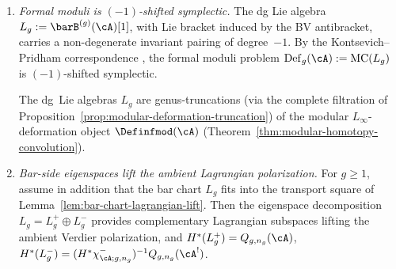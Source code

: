 \begin{theorem}
\begin{enumerate}[label=\textup{(\roman*)}]
\item \emph{Formal moduli is $(-1)$-shifted symplectic.}
 The dg Lie algebra $L_g := \barB^{(g)}(\cA)[1]$, with Lie bracket
 induced by the BV antibracket, carries a non-degenerate invariant
 pairing of degree~$-1$. By the Kontsevich--Pridham correspondence
 \cite{Pridham17}, the formal moduli problem
 $\mathrm{Def}_g(\cA) := \mathrm{MC}(L_g)$
 is $(-1)$-shifted symplectic.

 The dg~Lie algebras $L_g$ are genus-truncations (via the complete
 filtration of
 Proposition~\ref{prop:modular-deformation-truncation}) of the
 modular $L_\infty$-deformation object $\Definfmod(\cA)$
 (Theorem~\ref{thm:modular-homotopy-convolution}).
\item \emph{Bar-side eigenspaces lift the ambient Lagrangian polarization.}
 For $g \geq 1$, assume in addition that the bar chart $L_g$ fits into
 the transport square of
 Lemma~\textup{\ref{lem:bar-chart-lagrangian-lift}}. Then the
 eigenspace decomposition $L_g = L_g^+ \oplus L_g^-$ provides
 complementary Lagrangian subspaces lifting the ambient Verdier
 polarization, and
 $H^*(L_g^+) = Q_{g,n_g}(\cA)$,
 $H^*(L_g^-) =
 (H^*\chi^-_{\cA;g,n_g})^{-1}Q_{g,n_g}(\cA^!)$.
\end{enumerate}
\end{theorem}

